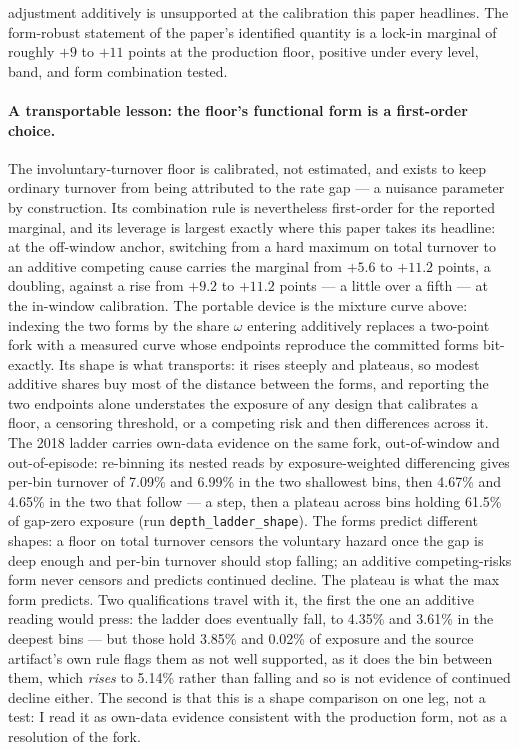 \documentclass[12pt]{article}
\begin{document}
adjustment additively is unsupported at the calibration this paper headlines. The form-robust statement of the paper's identified quantity is a lock-in marginal of roughly $+9$ to $+11$ points at the production floor, positive under every level, band, and form combination tested.

\paragraph{A transportable lesson: the floor's functional form is a first-order choice.} The involuntary-turnover floor is calibrated, not estimated, and exists to keep ordinary turnover from being attributed to the rate gap --- a nuisance parameter by construction. Its combination rule is nevertheless first-order for the reported marginal, and its leverage is largest exactly where this paper takes its headline: at the off-window anchor, switching from a hard maximum on total turnover to an additive competing cause carries the marginal from $+5.6$ to $+11.2$ points, a doubling, against a rise from $+9.2$ to $+11.2$ points --- a little over a fifth --- at the in-window calibration. The portable device is the mixture curve above: indexing the two forms by the share $\omega$ entering additively replaces a two-point fork with a measured curve whose endpoints reproduce the committed forms bit-exactly. Its shape is what transports: it rises steeply and plateaus, so modest additive shares buy most of the distance between the forms, and reporting the two endpoints alone understates the exposure of any design that calibrates a floor, a censoring threshold, or a competing risk and then differences across it. The 2018 ladder carries own-data evidence on the same fork, out-of-window and out-of-episode: re-binning its nested reads by exposure-weighted differencing gives per-bin turnover of 7.09\% and 6.99\% in the two shallowest bins, then 4.67\% and 4.65\% in the two that follow --- a step, then a plateau across bins holding 61.5\% of gap-zero exposure (run \texttt{depth\_ladder\_shape}). The forms predict different shapes: a floor on total turnover censors the voluntary hazard once the gap is deep enough and per-bin turnover should stop falling; an additive competing-risks form never censors and predicts continued decline. The plateau is what the max form predicts. Two qualifications travel with it, the first the one an additive reading would press: the ladder does eventually fall, to 4.35\% and 3.61\% in the deepest bins --- but those hold 3.85\% and 0.02\% of exposure and the source artifact's own rule flags them as not well supported, as it does the bin between them, which \emph{rises} to 5.14\% rather than falling and so is not evidence of continued decline either. The second is that this is a shape comparison on one leg, not a test: I read it as own-data evidence consistent with the production form, not as a resolution of the fork.
\end{document}
